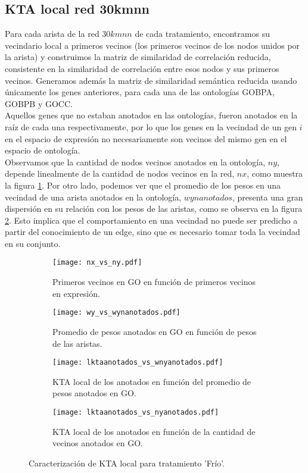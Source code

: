 \subsection{KTA local red 30kmnn}
Para cada arista de la red $30kmnn$ de cada tratamiento, encontramos su vecindario local a primeros vecinos (los primeros vecinos de los nodos unidos por la arista) y construimos la matriz de similaridad de correlación reducida, consistente en la similaridad de correlación entre esos nodos y sus primeros vecinos. Generamos además la matriz de similaridad semántica reducida usando únicamente los genes anteriores, para cada una de las ontologías GOBPA, GOBPB y GOCC.\\
Aquellos genes que no estaban anotados en las ontologías, fueron anotados en la raíz de cada una respectivamente, por lo que los genes en la vecindad de un gen $i$ en el espacio de expresión no necesariamente son vecinos del mismo gen en el espacio de ontología.\\
Observamos que la cantidad de nodos vecinos anotados en la ontología, $ny$, depende linealmente de la cantidad de nodos vecinos en la red, $nx$, como muestra la figura \ref{fig:nx_vs_ny}. Por otro lado, podemos ver que el promedio de los pesos en una vecindad de una arista anotados en la ontología, $wynanotados$, presenta una gran dispersión en su relación con los pesos de las aristas, como se observa en la figura \ref{fig:wy_vs_wynanotados}. Esto implica que el comportamiento en una vecindad no puede ser predicho a partir del conocimiento de un edge, sino que es necesario tomar toda la vecindad en su conjunto.
\begin{sidewaysfigure}[t!]
    \centering
    \begin{subfigure}[t]{0.45\textwidth}
    \centering
    \texttt{[image: nx\_vs\_ny.pdf]}
    \caption{Primeros vecinos en GO en función de primeros vecinos en expresión.}
    \label{fig:nx_vs_ny}
    \end{subfigure}    
    \begin{subfigure}[t]{0.45\textwidth}
    \centering
    \texttt{[image: wy\_vs\_wynanotados.pdf]}
    \caption{Promedio de pesos anotados en GO en función de pesos de las aristas.}
    \label{fig:wy_vs_wynanotados}
    \end{subfigure}    
    \begin{subfigure}[t]{0.45\textwidth}
    \centering
    \texttt{[image: lktaanotados\_vs\_wnyanotados.pdf]}
    \caption{KTA local de los anotados en función del promedio de pesos anotados en GO.}
    \label{fig:lktaanotados_vs_wnyanotados}
    \end{subfigure}    
    \begin{subfigure}[t]{0.45\textwidth}
    \centering
    \texttt{[image: lktaanotados\_vs\_nyanotados.pdf]}
    \caption{KTA local de los anotados en función de la cantidad de vecinos anotados en GO.}
    \label{fig:lktaanotados_vs_nyanotados}
    \end{subfigure}            
    \label{fig:ktalocal}
    \caption{Caracterización de KTA local para tratamiento 'Frío'.}
\end{sidewaysfigure}
